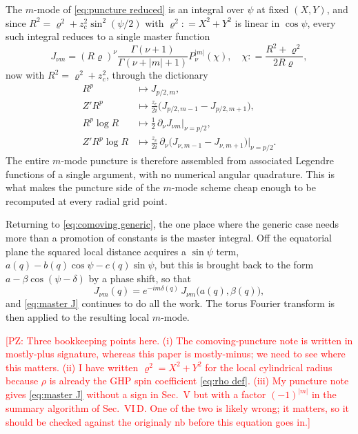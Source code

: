 \documentclass[%
reprint,
 prd,
superscriptaddress,
nofootinbib,
aps,
dvipsnames
]{revtex4-2}
\newcommand{\PZ}[1]{\textcolor{red}{\textsf{[PZ: #1]}}}
\newcommand{\emm}{m}
\def\defeq{\mathrel{\mathop{:}}=}
\begin{document}
The $m$-mode of \eqref{eq:puncture reduced} is an integral over $\psi$ at
fixed $(X,Y)$, and since $R^{2} = \varrho^{2} + z_{c}^{2}\sin^{2}(\psi/2)$
with $\varrho^{2} \defeq X^{2}+Y^{2}$ is linear in $\cos\psi$, every such
integral reduces to a single master function
\begin{equation}\label{eq:master J}
  J_{\nu \emm}
  = (R\varrho)^{\nu}
    \frac{\Gamma(\nu+1)}{\Gamma(\nu+|\emm|+1)}
    P^{|\emm|}_{\nu}(\chi),
  \quad
  \chi \defeq \frac{R^{2}+\varrho^{2}}{2R\varrho},
\end{equation}
now with $R^{2} = \varrho^{2}+z_{c}^{2}$, through the dictionary
\begin{subequations}\label{eq:puncture dictionary}
\begin{align}
  R^{p} &\mapsto J_{p/2,\emm},\\
  Z'R^{p} &\mapsto \tfrac{z_{c}}{2i}\big(J_{p/2,\emm-1}-J_{p/2,\emm+1}\big),\\
  R^{p}\log R &\mapsto \tfrac12\,\partial_{\nu}J_{\nu \emm}\big|_{\nu=p/2},\\
  Z'R^{p}\log R &\mapsto \tfrac{z_{c}}{2i}\,\partial_{\nu}
   \big(J_{\nu,\emm-1}-J_{\nu,\emm+1}\big)\big|_{\nu=p/2}.
\end{align}
\end{subequations}
The entire $m$-mode puncture is therefore assembled from associated Legendre
functions of a single argument, with no numerical angular quadrature. This is
what makes the puncture side of the $m$-mode scheme cheap enough to be
recomputed at every radial grid point.

Returning to \eqref{eq:comoving generic}, the one place where the generic
case needs more than a promotion of constants is the master integral. Off the
equatorial plane the squared local distance acquires a $\sin\psi$ term,
$a(q)-b(q)\cos\psi-c(q)\sin\psi$, but this is brought back to the form
$a-\beta\cos(\psi-\delta)$ by a phase shift, so that
\begin{equation}\label{eq:J generic}
  J_{\nu\emm}(q) = e^{-i\emm\delta(q)}\,
  J_{\nu\emm}\big(a(q),\beta(q)\big),
\end{equation}
and \eqref{eq:master J} continues to do all the work. The torus Fourier
transform is then applied to the resulting local $\emm$-mode.

\PZ{Three bookkeeping points here.
(i) The comoving-puncture note is written in mostly-plus signature, whereas
this paper is mostly-minus; we need to see where this matters.
(ii) I have written $\varrho^{2}=X^{2}+Y^{2}$ for the local cylindrical
radius because $\rho$ is already the GHP spin coefficient
\eqref{eq:rho def}.
(iii) My puncture note gives \eqref{eq:master J} without a sign in Sec.~V but with a
factor $(-1)^{|\emm|}$ in the summary algorithm of Sec.~VI\,D.  One of the
two is likely wrong; it matters, so it should be checked against the originaly nb before
this equation goes in.}
\end{document}
